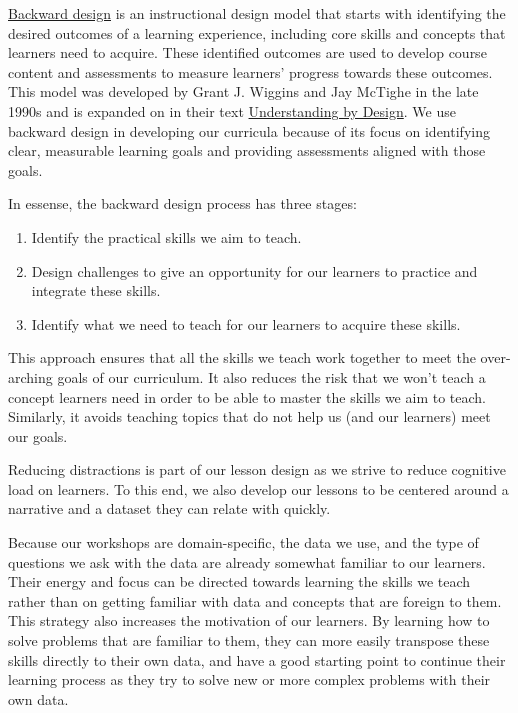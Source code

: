 \documentclass[
]{book}
\providecommand{\tightlist}{%
  \setlength{\itemsep}{0pt}\setlength{\parskip}{0pt}}
\begin{document}
\href{https://en.wikipedia.org/wiki/Backward_design}{Backward design} is an instructional
design model that starts with identifying the desired outcomes of a learning experience,
including core skills and concepts that learners need to acquire. These identified outcomes
are used to develop course content and assessments to measure learners' progress towards
these outcomes. This model was developed by Grant J. Wiggins and Jay McTighe in the late
1990s and is expanded on in their text
\href{https://www.pearson.com/us/higher-education/program/Wiggins-Understanding-by-Design-Expanded-Second-Edition-2nd-Edition/PGM229455.html}{Understanding by Design}. We use backward design in developing our curricula because of its focus on identifying clear, measurable
learning goals and providing assessments aligned with those goals.

In essense, the backward design process has three stages:

\begin{enumerate}
\def\labelenumi{\arabic{enumi}.}
\tightlist
\item
  Identify the practical skills we aim to teach.
\item
  Design challenges to give an opportunity for our learners to practice and
  integrate these skills.
\item
  Identify what we need to teach for our learners to acquire these skills.
\end{enumerate}

This approach ensures that all the skills we teach work together to meet the over-arching
goals of our curriculum. It also reduces the risk that we won't teach a concept learners
need in order to be able
to master the skills we aim to teach. Similarly, it avoids teaching topics that do not help us (and our learners) meet our goals.

Reducing distractions is part of our lesson design as we strive to reduce cognitive load on learners. To this end, we also develop our lessons to be centered around a narrative and a dataset they can relate with quickly.

Because our workshops are domain-specific, the data we use, and the type of questions we ask
with the data are already somewhat familiar to our learners. Their energy and focus can be
directed towards learning the skills we teach rather than on getting familiar with data and
concepts that are foreign to them. This strategy also increases the motivation of our
learners. By learning how to solve problems that are familiar to them, they can more easily
transpose these skills directly to their own data, and have a good starting point to
continue their learning process as they try to solve new or more complex problems with their
own data.
\end{document}
